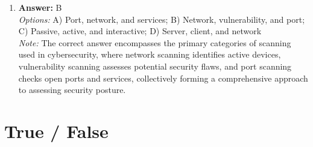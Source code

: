 \documentclass[12pt]{article}
\begin{document}
\begin{enumerate}[label=\arabic*.]
\item \textbf{Answer:} B
\\ \textit{Options:} A) Port, network, and services; B) Network, vulnerability, and port; C) Passive, active, and interactive; D) Server, client, and network
\\ \textit{Note:} The correct answer encompasses the primary categories of scanning used in cybersecurity, where network scanning identifies active devices, vulnerability scanning assesses potential security flaws, and port scanning checks open ports and services, collectively forming a comprehensive approach to assessing security posture.
\end{enumerate}

\section*{True / False}
\end{document}
